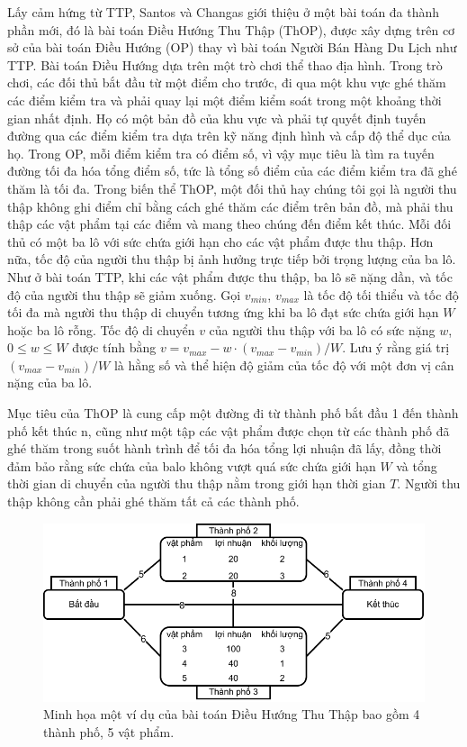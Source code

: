 Lấy cảm hứng từ TTP, Santos và Changas \cite{8477853} giới thiệu ở một bài toán đa thành phần mới, đó là bài toán Điều Hướng Thu Thập (ThOP), được xây dựng trên cơ sở của bài toán Điều Hướng (OP) thay vì bài toán Người Bán Hàng Du Lịch như TTP. Bài toán Điều Hướng dựa trên một trò chơi thể thao địa hình. Trong trò chơi, các đối thủ bắt đầu từ một điểm cho trước, đi qua một khu vực ghé thăm các điểm kiểm tra và phải quay lại một điểm kiểm soát trong một khoảng thời gian nhất định. Họ có một bản đồ của khu vực và phải tự quyết định tuyến đường qua các điểm kiểm tra dựa trên kỹ năng định hình và cấp độ thể dục của họ. Trong OP, mỗi điểm kiểm tra có điểm số, vì vậy mục tiêu là tìm ra tuyến đường tối đa hóa tổng điểm số, tức là tổng số điểm của các điểm kiểm tra đã ghé thăm là tối đa. Trong biến thể ThOP, một đối thủ hay chúng tôi gọi là người thu thập không ghi điểm chỉ bằng cách ghé thăm các điểm trên bản đồ, mà phải thu thập các vật phẩm tại các điểm và mang theo chúng đến điểm kết thúc. Mỗi đối thủ có một ba lô với sức chứa giới hạn cho các vật phẩm được thu thập. Hơn nữa, tốc độ của người thu thập bị ảnh hưởng trực tiếp bởi trọng lượng của ba lô. Như ở bài toán TTP, khi các vật phẩm được thu thập, ba lô sẽ nặng dần, và tốc độ của người thu thập sẽ giảm xuống. Gọi $v_{min}$, $v_{max}$ là tốc độ tối thiểu và tốc độ tối đa mà người thu thập di chuyển tương ứng khi ba lô đạt sức chứa giới hạn $W$ hoặc ba lô rỗng. Tốc độ di chuyển $v$ của người thu thập với ba lô có sức nặng $w$, $0 \leq w \leq W$ được tính bằng $v = v_{max} - w \cdot(v_{max} - v_{min})/W$. Lưu ý rằng giá trị $(v_{max} - v_{min})/W$ là hằng số và thể hiện độ giảm của tốc độ với một đơn vị cân nặng của ba lô.

Mục tiêu của ThOP là cung cấp một đường đi từ thành phố bắt đầu 1 đến thành phố kết thúc n, cũng như một tập các vật phẩm được chọn từ các thành phố đã ghé thăm trong suốt hành trình để tối đa hóa tổng lợi nhuận đã lấy, đồng thời đảm bảo rằng sức chứa của balo không vượt quá sức chứa giới hạn $W$ và tổng thời gian di chuyển của người thu thập nằm trong giới hạn thời gian $T$. Người thu thập không cần phải ghé thăm tất cả các thành phố.

\begin{figure}[ht!]
    \centering
    \includegraphics[width=\textwidth]{Figures/ThOP-instance.pdf}
    \caption[Minh họa một ví dụ của bài toán Điều Hướng Thu Thập.]{Minh họa một ví dụ của bài toán Điều Hướng Thu Thập bao gồm 4 thành phố, 5 vật phẩm.}
    \label{fig:ThOPinstance}
\end{figure}

